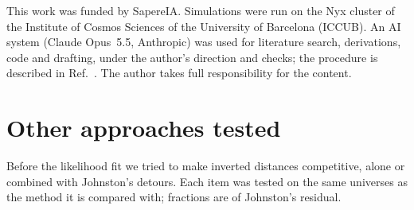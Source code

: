 \documentclass[prd,twocolumn,superscriptaddress,nofootinbib,amsmath,amssymb,floatfix]{revtex4-2}
\begin{document}
\begin{acknowledgments}
This work was funded by SapereIA. Simulations were run on the Nyx cluster of the Institute of Cosmos Sciences of the University of Barcelona (ICCUB). An AI system (Claude Opus~5.5, Anthropic) was used for literature search, derivations, code and drafting, under the author's direction and checks; the procedure is described in Ref.~\cite{MethodNote}. The author takes full responsibility for the content.
\end{acknowledgments}

\appendix
\section{Other approaches tested}\label{app:dropped}
Before the likelihood fit we tried to make inverted distances competitive, alone or combined with Johnston's detours. Each item was tested on the same universes as the method it is compared with; fractions are of Johnston's residual.
\end{document}
